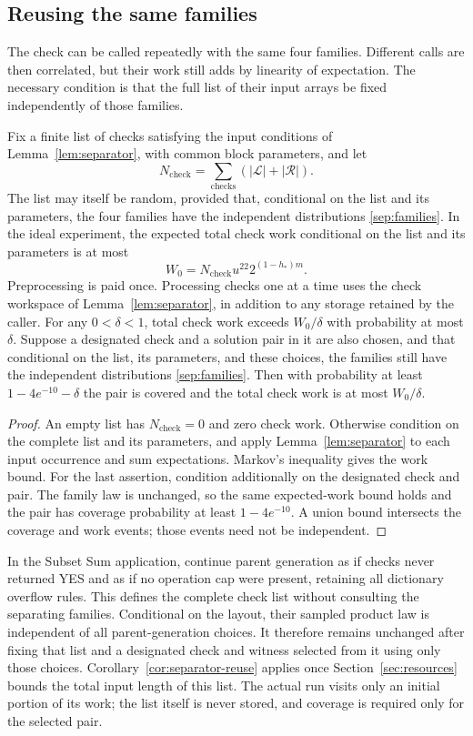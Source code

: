 \subsection{Reusing the same families}

The check can be called repeatedly with the same four families.
Different calls are then correlated, but their work still adds by
linearity of expectation. The necessary condition is that the full
list of their input arrays be fixed independently of those families.

\begin{corollary}\label{cor:separator-reuse}
Fix a finite list of checks satisfying the input conditions of
Lemma~\ref{lem:separator}, with common block parameters, and let
\[
 N_{\mathrm{check}}=\sum_{\text{checks}}(|\mathcal L|+|\mathcal R|).
\]
The list may itself be random, provided that, conditional on the list
and its parameters, the four families have the independent
distributions \eqref{sep:families}. In the ideal experiment, the
expected total check work conditional on the list and its parameters
is at most
\[
 W_0=N_{\mathrm{check}} u^{22}2^{(1-h_*)m}.
\]
Preprocessing is paid once. Processing checks one at a time uses the
check workspace of Lemma~\ref{lem:separator}, in addition to any
storage retained by the caller. For any $0<\delta<1$, total
check work exceeds $W_0/\delta$ with probability at most $\delta$.
Suppose a designated check and a solution pair in it are also chosen,
and that conditional on the list, its parameters, and these choices,
the families still have the independent distributions
\eqref{sep:families}. Then with probability at least
$1-4e^{-10}-\delta$ the pair is covered and the total check work is
at most $W_0/\delta$.
\end{corollary}

\begin{proof}
An empty list has $N_{\mathrm{check}}=0$ and zero check work. Otherwise
condition on the complete list and its parameters, and apply Lemma~\ref{lem:separator}
to each input occurrence and sum expectations. Markov's inequality
gives the work bound. For the last assertion, condition additionally
on the designated check and pair. The family law is unchanged, so
the same expected-work bound holds and the pair has coverage
probability at least $1-4e^{-10}$. A union bound intersects the
coverage and work events; those events need not be independent.
\end{proof}

In the Subset Sum application, continue parent generation as if checks
never returned YES and as if no operation cap were present, retaining
all dictionary overflow rules. This defines the complete check list
without consulting the separating families. Conditional on the layout,
their sampled product law is independent of all parent-generation
choices. It therefore remains unchanged after fixing that list and a
designated check and witness selected from it using only those choices.
Corollary~\ref{cor:separator-reuse} applies once
Section~\ref{sec:resources} bounds the total input length of this list.
The actual run visits only an initial portion of its work; the list
itself is never stored, and coverage is required only for the selected
pair.
